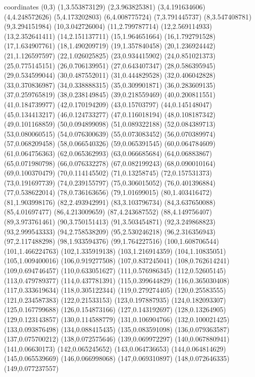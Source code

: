  coordinates {
(0,3)
(1,3.553873129)
(2,3.963825381)
(3,4.191634606)
(4,4.248572626)
(5,4.173202803)
(6,4.008775724)
(7,3.791445737)
(8,3.547408781)
(9,3.294151984)
(10,3.042726004)
(11,2.799787714)
(12,2.569114933)
(13,2.352641411)
(14,2.151137711)
(15,1.964651664)
(16,1.792791528)
(17,1.634907761)
(18,1.490209719)
(19,1.357840458)
(20,1.236924442)
(21,1.126597597)
(22,1.026025825)
(23,0.934415902)
(24,0.851021373)
(25,0.775145151)
(26,0.706139951)
(27,0.643407347)
(28,0.586395945)
(29,0.534599044)
(30,0.487552011)
(31,0.444829528)
(32,0.406042828)
(33,0.370836987)
(34,0.338888315)
(35,0.309901871)
(36,0.283609135)
(37,0.259765819)
(38,0.238149845)
(39,0.218559469)
(40,0.200811551)
(41,0.184739977)
(42,0.170194209)
(43,0.15703797)
(44,0.145148047)
(45,0.134413217)
(46,0.124733277)
(47,0.116018194)
(48,0.108187342)
(49,0.101168859)
(50,0.094899098)
(51,0.089322188)
(52,0.084389713)
(53,0.080060515)
(54,0.076300639)
(55,0.073083452)
(56,0.070389974)
(57,0.068209458)
(58,0.066540326)
(59,0.065391545)
(60,0.064784609)
(61,0.064756363)
(62,0.065362993)
(63,0.066685684)
(64,0.06883867)
(65,0.071980798)
(66,0.076332278)
(67,0.082199243)
(68,0.090010164)
(69,0.100370479)
(70,0.114145502)
(71,0.13258745)
(72,0.157531373)
(73,0.191697739)
(74,0.239155797)
(75,0.306015052)
(76,0.401396884)
(77,0.538622014)
(78,0.736163656)
(79,1.01699015)
(80,1.403416472)
(81,1.903998176)
(82,2.493942991)
(83,3.103796734)
(84,3.637650088)
(85,4.01697477)
(86,4.213009659)
(87,4.243687552)
(88,4.149756407)
(89,3.973761461)
(90,3.750151413)
(91,3.503454871)
(92,3.249868823)
(93,2.999543333)
(94,2.758538209)
(95,2.530246218)
(96,2.316356943)
(97,2.117488298)
(98,1.933594376)
(99,1.764227516)
(100,1.608706544)
(101,1.466224763)
(102,1.335919138)
(103,1.216914359)
(104,1.10835051)
(105,1.009400016)
(106,0.919277508)
(107,0.837245041)
(108,0.762614241)
(109,0.694746457)
(110,0.633051627)
(111,0.576986345)
(112,0.52605145)
(113,0.479789377)
(114,0.437781391)
(115,0.399644829)
(116,0.365030408)
(117,0.333619634)
(118,0.305122344)
(119,0.279274405)
(120,0.25583555)
(121,0.234587383)
(122,0.21533153)
(123,0.197887935)
(124,0.182093307)
(125,0.167799688)
(126,0.154873166)
(127,0.143192697)
(128,0.13264905)
(129,0.123143857)
(130,0.114588779)
(131,0.106904766)
(132,0.100021425)
(133,0.093876498)
(134,0.088415435)
(135,0.083591098)
(136,0.079363587)
(137,0.075700212)
(138,0.072575646)
(139,0.069972297)
(140,0.067880941)
(141,0.06630173)
(142,0.065245652)
(143,0.064736653)
(144,0.064814629)
(145,0.065539669)
(146,0.066998068)
(147,0.069310897)
(148,0.072646335)
(149,0.077237557)
}
